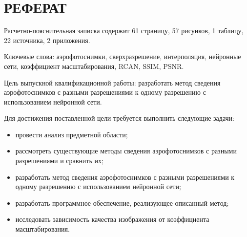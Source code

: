 \chapter*{РЕФЕРАТ}
\setcounter{page}{5}

Расчетно-пояснительная записка содержит 61 страницу, 57 рисунков, 1 таблицу, 22 источника, 2 приложения.

Ключевые слова: аэрофотоснимки, сверхразрешение, интерполяция, нейронные сети, коэффициент масштабирования, RCAN, SSIM, PSNR. 

Цель выпускной квалификационной работы: разработать метод сведения аэрофотоснимков с разными разрешениями к одному разрешению с использованием нейронной сети.

Для достижения поставленной цели требуется выполнить следующие задачи:

\begin{itemize}[label=---]
    \item провести анализ предметной области;
    \item рассмотреть существующие методы сведения аэрофотоснимков с разными разрешениями и сравнить их;
    \item разработать метод сведения аэрофотоснимков с разными разрешениями к одному разрешению с использованием нейронной сети;
    \item разработать программное обеспечение, реализующее описанный метод;
    \item исследовать зависимость качества изображения от коэффициента масштабирования.
\end{itemize}